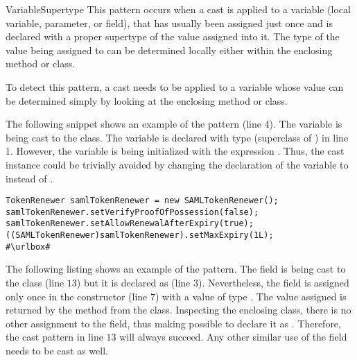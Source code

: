 \begin{pattern}{VariableSupertype}
This pattern occurs when a cast is applied to a variable (local variable,
parameter, or field),
that has usually been assigned just once and
is declared with a proper supertype of the value assigned into it.
The type of the value being assigned to can be determined locally
either within the enclosing method or class.

To detect this pattern, a cast needs to be applied to a variable whose
value can be determined simply by looking at
the enclosing method or class.


\instances{}
The following snippet%
\def\urlvar{http://bit.ly/apache_cxf_2SNoUXj}
shows an example of the \thisp{} pattern (line 4).
The  variable is being cast to the  class.
The variable is declared with type  (superclass of ) in line 1.
However, the variable is being initialized with the expression . 
Thus, the cast instance could be trivially avoided by changing the declaration of the  variable to  instead of .

\begin{verbatim}
TokenRenewer samlTokenRenewer = new SAMLTokenRenewer();
samlTokenRenewer.setVerifyProofOfPossession(false);
samlTokenRenewer.setAllowRenewalAfterExpiry(true);
((SAMLTokenRenewer)samlTokenRenewer).setMaxExpiry(1L);
#\urlbox#
\end{verbatim}

The following listing shows an example of the \thisp{} pattern.
The field  is being cast to the  class (line $13$) but it is declared as  (line $3$).
Nevertheless, the field is assigned only once in the constructor (line $7$)
with a value of type .
The value assigned is returned by the method
 from the  class.%
Inspecting the enclosing class, there is no other assignment to the
 field,
thus making possible to declare it as .
Therefore, the cast pattern in line $13$ will always succeed.
Any other similar use of the  field needs to be cast as well.


\end{pattern}
